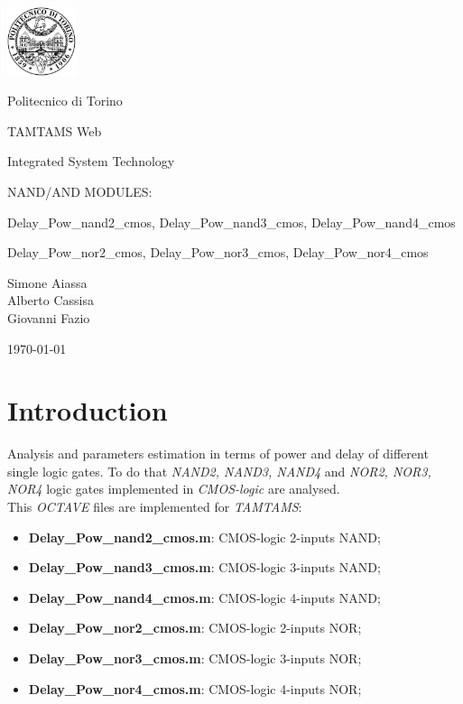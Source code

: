 \documentclass[12pt,  english, makeidx, a4paper, titlepage, oneside]{article}
\begin{document}
	\begin{titlepage}
		\vspace{1cm}
		\centerline{
			\includegraphics[width=2cm]{./img/logopoli.eps}}  
		\centerline{\LARGE Politecnico di Torino}
		\bigskip
		\vspace{3cm}
		\centerline{\LARGE TAMTAMS Web}
		\vspace{0.5cm}
		\centerline{\Large Integrated System Technology}
		\vspace{3cm}
		\centerline{\huge NAND/AND MODULES:}
		\vspace{0.7cm}
		\centerline{\Large\sf Delay\_Pow\_nand2\_cmos, Delay\_Pow\_nand3\_cmos, Delay\_Pow\_nand4\_cmos}
		\vspace{0.3cm}
		\centerline{\Large\sf Delay\_Pow\_nor2\_cmos, Delay\_Pow\_nor3\_cmos, Delay\_Pow\_nor4\_cmos}
		\bigskip
		\vspace{5cm}
\centerline{\Large Simone Aiassa\\Alberto Cassisa\\Giovanni Fazio}
\vspace{1cm}
\centerline{\Large \today}
\end{titlepage}

\tableofcontents

\newpage

\lstset{language=Matlab}

\newpage


\section{Introduction}


Analysis and parameters estimation in terms of power and delay of different single logic gates.
To do that \textit{NAND2, NAND3, NAND4}  and \textit{NOR2, NOR3, NOR4} logic gates implemented in \textit{CMOS-logic} are analysed.  \\
This \textit{OCTAVE} files are implemented for \textit{TAMTAMS}: 
\begin{itemize}
\item \textbf{Delay\_Pow\_nand2\_cmos.m}: CMOS-logic 2-inputs NAND;
\item \textbf{Delay\_Pow\_nand3\_cmos.m}: CMOS-logic 3-inputs NAND;
\item \textbf{Delay\_Pow\_nand4\_cmos.m}: CMOS-logic 4-inputs NAND;
\item \textbf{Delay\_Pow\_nor2\_cmos.m}: CMOS-logic 2-inputs NOR;
\item \textbf{Delay\_Pow\_nor3\_cmos.m}: CMOS-logic 3-inputs NOR;
\item \textbf{Delay\_Pow\_nor4\_cmos.m}: CMOS-logic 4-inputs NOR;
\end{itemize}
\end{document}

